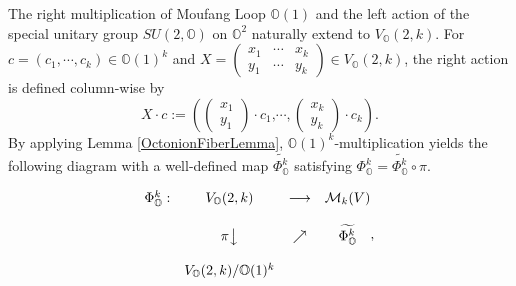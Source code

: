 \documentclass[a4paper]{article}%
\begin{document}
The right multiplication of Moufang Loop $\mathbb{O}(1)$ and the left action
of the special unitary group $SU(2,\mathbb{O})$ on $\mathbb{O}^{2}$ naturally
extend to $V_{\mathbb{O}}(2,k)$. For $c=(c_{1},\cdots,c_{k})\in\mathbb{O}%
(1)^{k}$ and $X=%
\begin{pmatrix}
x_{1} & \cdots & x_{k}\\
y_{1} & \cdots & y_{k}%
\end{pmatrix}
\in V_{\mathbb{O}}(2,k)$, the right action is defined column-wise by\quad\
\[
X\cdot c:=\left(
\begin{pmatrix}
x_{1}\\
y_{1}%
\end{pmatrix}
\cdot c_{1}\text{,}\cdots,%
\begin{pmatrix}
x_{k}\\
y_{k}%
\end{pmatrix}
\cdot c_{k}\right)  .
\]
By applying Lemma \ref{OctonionFiberLemma}, $\mathbb{O}(1)^{k}$-multiplication
yields the following diagram with a well-defined map $\widetilde
{\Phi_{\mathbb{O}}^{k}}$ satisfying $\Phi_{\mathbb{O}}^{k}=\widetilde
{\Phi_{\mathbb{O}}^{k}}\circ\pi$.%

\[%
\begin{matrix}
\Phi_{\mathbb{O}}^{k}: & V_{\mathbb{O}}(2,k) & \longrightarrow &
\mathcal{M}_{k}(V)\\
&  &  & \\
& \pi\big\downarrow & \nearrow & \widetilde{\Phi_{\mathbb{O}}^{k}}\\
&  &  & \\
& V_{\mathbb{O}}(2,k)/\mathbb{O}(1)^{k} &  &
\end{matrix}
,
\]
\end{document}
